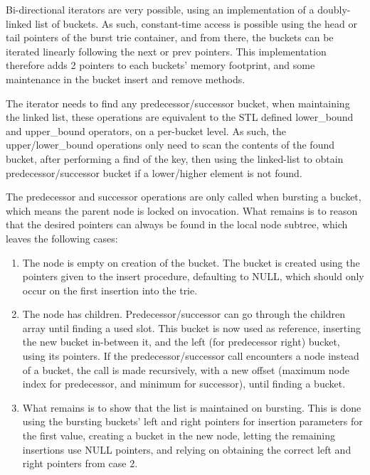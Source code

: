 Bi-directional iterators are very possible, using an implementation of a
doubly-linked list of buckets. As such, constant-time access is possible using
the {\keyword head} or {\keyword tail} pointers of the burst trie container,
and from there, the buckets can be iterated linearly following the {\keyword
next} or {\keyword prev} pointers. This implementation therefore adds 2
pointers to each buckets' memory footprint, and some maintenance in the bucket
insert and remove methods.

The iterator needs to find any predecessor/successor bucket, when maintaining
the linked list, these operations are equivalent to the STL defined {\keyword
lower\_bound} and {\keyword upper\_bound} operators, on a per-bucket level. As such, the
{\keyword upper/lower\_bound} operations only need to scan the contents of the
found bucket, after performing a {\keyword find} of the key, then using the
linked-list to obtain predecessor/successor bucket if a lower/higher element is
not found.

The predecessor and successor operations are only called when bursting a bucket,
which means the parent node is locked on invocation. What remains is to reason
that the desired pointers can always be found in the local node subtree,
which leaves the following cases:
\begin{enumerate}
    \item The node is empty on creation of the bucket. The bucket is
    created using the pointers given to the insert procedure, defaulting to
    {\keyword NULL}, which should only occur on the first insertion into the trie.
    \item The node has children. Predecessor/successor can go through
    the children array until finding a used slot. This bucket is now used as
    reference, inserting the new bucket in-between it, and the left (for
    predecessor right) bucket, using its pointers. If the predecessor/successor
    call encounters a node instead of a bucket, the call is made recursively,
    with a new offset (maximum node index for predecessor, and minimum for successor),
    until finding a bucket.
    \item  What remains is to show that the list is maintained on bursting.
    This is done using the bursting buckets' left and right pointers for insertion
    parameters for the first value, creating a bucket in the new node, letting the
    remaining insertions use {\keyword NULL} pointers, and relying on obtaining the
    correct left and right pointers from case 2.
\end{enumerate}

